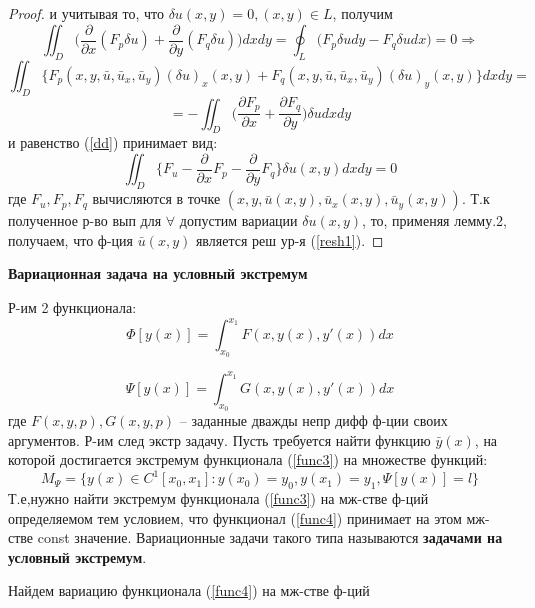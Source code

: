 \documentclass{article}
\begin{document}
\begin{proof}
    и учитывая то, что $\delta u(x, y)=0, (x, y) \in L$, получим
    $$\iint_D \Big( \frac{\partial}{\partial x}(F_p\delta u) + \frac{\partial}{\partial y}(F_q\delta u)\Big)dxdy=\oint_L\Big(F_p\delta udy-F_q\delta udx\Big)=0\Longrightarrow$$
    $$\iint_D \Big\{ F_p(x,y,\bar u, \bar u_x, \bar u_y)(\delta u)_x(x, y)+F_q(x,y,\bar u, \bar u_x, \bar u_y)(\delta u)_y(x, y)\Big\}dxdy=$$
    $$=-\iint_D \Big( \frac{\partial F_p}{\partial x}+\frac{\partial F_q}{\partial y}\Big)\delta u dxdy$$
    и равенство (\ref{dd}) принимает вид:
    $$\iint_D \Big\{F_u-\frac{\partial}{\partial x}F_p-\frac{\partial}{\partial y}F_q\Big\}\delta u(x,y)dxdy=0$$
    где $F_u,F_p,F_q$ вычисляются в точке $(x, y, \bar u(x, y), \bar u_x(x, y), \bar u_y(x, y))$. Т.к полученное р-во вып для $\forall$ допустим вариации
    $\delta u(x, y)$, то, применяя лемму.2, получаем, что ф-ция $\bar u(x, y)$ является реш ур-я (\ref{resh1}).
\end{proof}

\textbf{Вариационная задача на условный экстремум}

Р-им 2 функционала:
\begin{equation}
    \Phi[y(x)]=\int_{x_0}^{x_1} F(x,y(x),y'(x))dx
    \label{func3}
\end{equation}

\begin{equation}
    \Psi[y(x)]=\int_{x_0}^{x_1} G(x,y(x),y'(x))dx
    \label{func4}
\end{equation}
где $F(x, y, p), G(x, y, p)$ – заданные дважды непр дифф ф-ции своих аргументов.
Р-им след экстр задачу. Пусть требуется найти функцию $\bar y(x)$, на которой достигается экстремум функционала (\ref{func3}) на множестве функций:
$$M_\Psi=\{y(x)\in C^1[x_0, x_1] : y(x_0) = y_0, y(x_1) = y_1, \Psi[y(x)]=l\}$$
Т.е,нужно найти экстремум функционала (\ref{func3}) на
мж-стве ф-ций определяемом тем условием, что функционал (\ref{func4})
принимает на этом мж-стве const значение. Вариационные задачи такого типа называются \textbf{задачами на условный экстремум}.

Найдем вариацию функционала (\ref{func4}) на мж-стве ф-ций 
\end{document}
